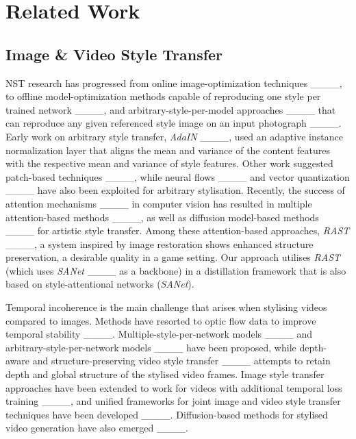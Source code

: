 \section{Related Work}
\subsection{Image \& Video Style Transfer}

NST research has progressed from online image-optimization techniques ____, to offline model-optimization methods capable of reproducing one style per trained network ____, and arbitrary-style-per-model approaches ____ that can reproduce any given referenced style image on an input photograph ____. Early work on arbitrary style transfer, \textit{AdaIN} ____, used an adaptive instance normalization layer that aligns the mean and variance of the content features with the respective mean and variance of style features. Other work suggested patch-based techniques ____, while neural flows ____ and vector quantization ____ have also been exploited for arbitrary stylisation. Recently, the success of attention mechanisms ____ in computer vision has resulted in multiple attention-based methods ____, as well as diffusion model-based methods ____ for artistic style transfer. Among these attention-based approaches, \textit{RAST} ____, a system inspired by image restoration shows enhanced structure preservation, a desirable quality in a game setting. Our approach utilises \textit{RAST} (which uses \textit{SANet} ____ as a backbone) in a distillation framework that is also based on style-attentional networks (\textit{SANet}).


Temporal incoherence is the main challenge that arises when stylising videos compared to images. Methods have resorted to optic flow data to improve temporal stability ____. Multiple-style-per-network models ____ and arbitrary-style-per-network models ____ have been proposed, while depth-aware and structure-preserving video style transfer ____ attempts to retain depth and global structure of the stylised video frames. Image style transfer approaches have been extended to work for videos with additional temporal loss training ____, and unified frameworks for joint image and video style transfer techniques have been developed ____. Diffusion-based methods for stylised video generation have also emerged ____.


